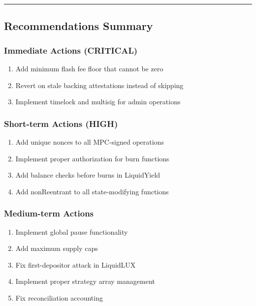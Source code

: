 \documentclass[
]{article}
\providecommand{\tightlist}{%
  \setlength{\itemsep}{0pt}\setlength{\parskip}{0pt}}
\begin{document}
\begin{center}\rule{0.5\linewidth}{0.5pt}\end{center}

\subsection{Recommendations Summary}\label{recommendations-summary}

\subsubsection{Immediate Actions
(CRITICAL)}\label{immediate-actions-critical}

\begin{enumerate}
\def\labelenumi{\arabic{enumi}.}
\tightlist
\item
  Add minimum flash fee floor that cannot be zero
\item
  Revert on stale backing attestations instead of skipping
\item
  Implement timelock and multisig for admin operations
\end{enumerate}

\subsubsection{Short-term Actions (HIGH)}\label{short-term-actions-high}

\begin{enumerate}
\def\labelenumi{\arabic{enumi}.}
\setcounter{enumi}{3}
\tightlist
\item
  Add unique nonces to all MPC-signed operations
\item
  Implement proper authorization for burn functions
\item
  Add balance checks before burns in LiquidYield
\item
  Add nonReentrant to all state-modifying functions
\end{enumerate}

\subsubsection{Medium-term Actions}\label{medium-term-actions}

\begin{enumerate}
\def\labelenumi{\arabic{enumi}.}
\setcounter{enumi}{7}
\tightlist
\item
  Implement global pause functionality
\item
  Add maximum supply caps
\item
  Fix first-depositor attack in LiquidLUX
\item
  Implement proper strategy array management
\item
  Fix reconciliation accounting
\end{enumerate}
\end{document}
